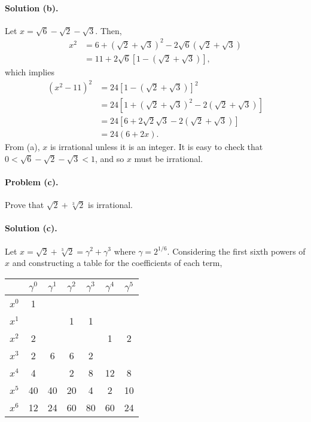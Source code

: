 \documentclass{article}
\begin{document}
\paragraph{Solution (b).} Let $x = \sqrt{6} - \sqrt{2} - \sqrt{3}$. Then,
\begin{align*}
  x^2 &= 6 + (\sqrt{2} + \sqrt{3})^2 - 2\sqrt{6}(\sqrt{2} + \sqrt{3}) \\
    &= 11 + 2\sqrt{6}[1 - (\sqrt{2} + \sqrt{3})],
\end{align*} which implies \begin{align*}
  (x^2 - 11)^2 &= 24[1 - (\sqrt{2} + \sqrt{3})]^2 \\
    &= 24[1 + (\sqrt{2} + \sqrt{3})^2 - 2(\sqrt{2} + \sqrt{3})] \\
    &= 24[6 + 2\sqrt{2}\sqrt{3} - 2(\sqrt{2} + \sqrt{3})] \\
    &= 24(6 + 2x).
\end{align*}
From (a), $x$ is irrational unless it is an integer. It is easy to check that
$0 < \sqrt{6} - \sqrt{2} - \sqrt{3} < 1$, and so $x$ must be irrational.

\paragraph{Problem (c).} Prove that $\sqrt{2} + \sqrt[3]{2}$ is irrational.

\paragraph{Solution (c).} Let $x = \sqrt{2} + \sqrt[3]{2} = \gamma^2 +
\gamma^3$ where $\gamma = 2^{1/6}$. Considering the first sixth powers of $x$
and constructing a table for the coefficients of each term,

\begin{tabular}{c | c c c c c c}
  & $\gamma^0$ & $\gamma^1$ & $\gamma^2$ & $\gamma^3$ & $\gamma^4$ & $\gamma^5$
  \\
  \hline
  $x^0$ & 1 & & & & & \\
  $x^1$ & & & 1 & 1 & & \\
  $x^2$ & 2 & & & & 1 & 2 \\
  $x^3$ & 2 & 6 & 6 & 2 & & \\
  $x^4$ & 4 & & 2 & 8 & 12 & 8 \\
  $x^5$ & 40 & 40 & 20 & 4 & 2 & 10 \\
  $x^6$ & 12 & 24 & 60 & 80 & 60 & 24 \\
\end{tabular}
\end{document}
